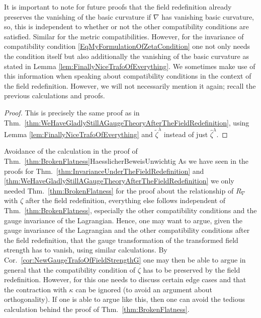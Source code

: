 \begin{remark}
\leavevmode\newline
It is important to note for future proofs that the field redefinition already preserves the vanishing of the basic curvature if $\nabla$ has vanishing basic curvature, so, this is independent to whether or not the other compatibility conditions are satisfied. Similar for the metric compatibilities. However, for the invariance of compatibility condition \eqref{EqMyFormulationOfZetaCondition} one not only needs the condition itself but also additionally the vanishing of the basic curvature as stated in Lemma \ref{lem:FinallyNiceTrafoOfEverything}. We sometimes make use of this information when speaking about compatibility conditions in the context of the field redefinition. However, we will not necessarily mention it again; recall the previous calculations and proofs.
\end{remark}

\begin{proof}
\leavevmode\newline
This is precisely the same proof as in Thm.~\ref{thm:WeHaveGladlyStillAGaugeTheoryAfterTheFieldRedefinition}, using Lemma \ref{lem:FinallyNiceTrafoOfEverything} and $\widetilde{\zeta}^\lambda$ instead of just $\widehat{\zeta}^\lambda$.
\end{proof}

\begin{remarks}{Avoidance of the calculation in the proof of Thm.~\ref{thm:BrokenFlatness}}{HaesslicherBeweisUnwichtig}
As we have seen in the proofs for Thm.~\ref{thm:InvarianceUnderTheFieldRedefinition} and \ref{thm:WeHaveGladlyStillAGaugeTheoryAfterTheFieldRedefinition} we only needed Thm.~\ref{thm:BrokenFlatness} for the proof about the relationship of $R_\nabla$ with $\zeta$ after the field redefinition, everything else follows independent of Thm.~\ref{thm:BrokenFlatness}, especially the other compatibility conditions and the gauge invariance of the Lagrangian. Hence, one may want to argue, given the gauge invariance of the Lagrangian and the other compatibility conditions after the field redefinition, that the gauge transformation of the transformed field strength has to vanish, using similar calculations. By Cor.~\ref{cor:NewGaugeTrafoOfFieldStrengthG} one may then be able to argue in general that the compatibility condition of $\zeta$ has to be preserved by the field redefinition. However, for this one needs to discuss certain edge cases and that the contraction with $\kappa$ can be ignored (to avoid an argument about orthogonality). If one is able to argue like this, then one can avoid the tedious calculation behind the proof of Thm.~\ref{thm:BrokenFlatness}.
\end{remarks}

